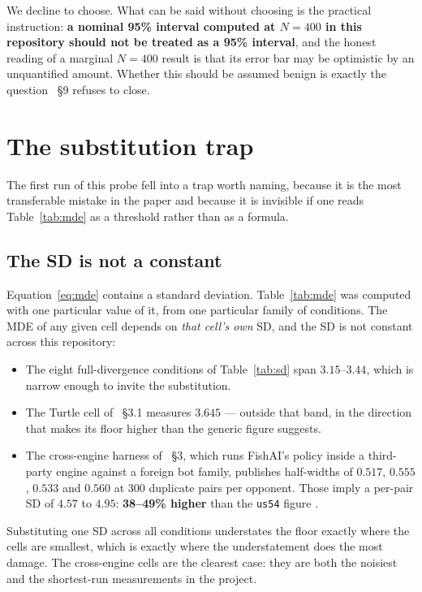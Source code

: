 \documentclass[11pt]{article}
\newcommand{\code}[1]{\texttt{#1}}
\newcommand{\usff}{\code{us54}}
\begin{document}
We decline to choose. What can be said without choosing is the practical instruction: \textbf{a
nominal 95\% interval computed at $N=400$ in this repository should not be treated as a 95\%
interval}, and the honest reading of a marginal $N=400$ result is that its error bar may be
optimistic by an unquantified amount. Whether this should be assumed benign is exactly the question
\cite{concession}~\S9 refuses to close.

\section{The substitution trap}
\label{sec:trap}

The first run of this probe fell into a trap worth naming, because it is the most transferable
mistake in the paper and because it is invisible if one reads Table~\ref{tab:mde} as a threshold
rather than as a formula.

\subsection{The SD is not a constant}

Equation~\eqref{eq:mde} contains a standard deviation. Table~\ref{tab:mde} was computed with one
particular value of it, from one particular family of conditions. The MDE of any given cell depends
on \emph{that cell's own} SD, and the SD is not constant across this repository:

\begin{itemize}
  \item The eight full-divergence conditions of Table~\ref{tab:sd} span $3.15$--$3.44$, which is
  narrow enough to invite the substitution.
  \item The Turtle cell of \cite{concession}~\S3.1 measures $\mathbf{3.645}$ --- outside that band,
  in the direction that makes its floor higher than the generic figure suggests.
  \item The cross-engine harness of \cite{crossplay}~\S3, which runs FishAI's policy inside a
  third-party engine against a foreign bot family, publishes half-widths of $0.517$, $0.555$,
  $0.533$ and $0.560$ at 300 duplicate pairs per opponent. Those imply a per-pair SD of
  $\mathbf{4.57}$ to $\mathbf{4.95}$: \textbf{38--49\% higher} than the \usff{} figure
  \cite{concession}.
\end{itemize}

Substituting one SD across all conditions understates the floor exactly where the cells are
smallest, which is exactly where the understatement does the most damage. The cross-engine cells are
the clearest case: they are both the noisiest and the shortest-run measurements in the project.
\end{document}
